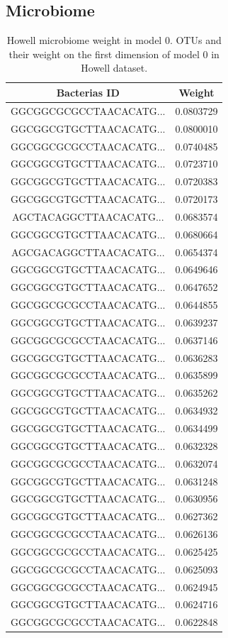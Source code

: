 \documentclass[
  12pt,
  a4paper,
  twoside,
  openright]{book}
\begin{document}
\hypertarget{microbiome-5}{%
\subsection{Microbiome}\label{microbiome-5}}

\begin{longtable}[t]{cc}
\caption[Howell microbiome weight in model 0]{\label{tab:howell-microbiome}Howell microbiome weight in model 0. OTUs and their weight on the first dimension of model 0 in Howell dataset.}\\
\toprule
Bacterias ID & Weight\\
\midrule
GGCGGCGCGCCTAACACATG... & 0.0803729\\
GGCGGCGTGCTTAACACATG... & 0.0800010\\
GGCGGCGCGCCTAACACATG... & 0.0740485\\
GGCGGCGTGCTTAACACATG... & 0.0723710\\
GGCGGCGTGCTTAACACATG... & 0.0720383\\
\addlinespace
GGCGGCGTGCTTAACACATG... & 0.0720173\\
AGCTACAGGCTTAACACATG... & 0.0683574\\
GGCGGCGTGCTTAACACATG... & 0.0680664\\
AGCGACAGGCTTAACACATG... & 0.0654374\\
GGCGGCGTGCTTAACACATG... & 0.0649646\\
\addlinespace
GGCGGCGTGCTTAACACATG... & 0.0647652\\
GGCGGCGCGCCTAACACATG... & 0.0644855\\
GGCGGCGTGCTTAACACATG... & 0.0639237\\
GGCGGCGCGCCTAACACATG... & 0.0637146\\
GGCGGCGTGCTTAACACATG... & 0.0636283\\
\addlinespace
GGCGGCGCGCCTAACACATG... & 0.0635899\\
GGCGGCGTGCTTAACACATG... & 0.0635262\\
GGCGGCGTGCTTAACACATG... & 0.0634932\\
GGCGGCGTGCTTAACACATG... & 0.0634499\\
GGCGGCGTGCTTAACACATG... & 0.0632328\\
\addlinespace
GGCGGCGCGCCTAACACATG... & 0.0632074\\
GGCGGCGTGCTTAACACATG... & 0.0631248\\
GGCGGCGTGCTTAACACATG... & 0.0630956\\
GGCGGCGTGCTTAACACATG... & 0.0627362\\
GGCGGCGCGCCTAACACATG... & 0.0626136\\
\addlinespace
GGCGGCGCGCCTAACACATG... & 0.0625425\\
GGCGGCGCGCCTAACACATG... & 0.0625093\\
GGCGGCGCGCCTAACACATG... & 0.0624945\\
GGCGGCGTGCTTAACACATG... & 0.0624716\\
GGCGGCGCGCCTAACACATG... & 0.0622848\\
\bottomrule
\end{longtable}
\end{document}
